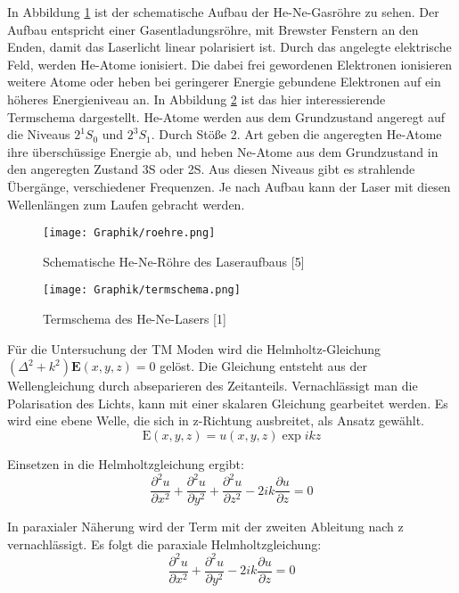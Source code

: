 \documentclass[10pt,twoside]{article}
\renewcommand{\1}{^{-1}}
\renewcommand{\2}{^{-2}}
\newcommand{\3}{^{-3}}
\newcommand{\4}{^{-4}}
\newcommand{\5}{^{-5}}
\newcommand{\6}{^{-6}}
\newcommand{\7}{^{-7}}
\newcommand{\8}{^{-8}}
\newcommand{\9}{^{-9}}
\begin{document}
In Abbildung \ref{fig:roehre} ist der schematische Aufbau der He-Ne-Gasröhre zu sehen. 
Der Aufbau entspricht einer Gasentladungsröhre, mit Brewster Fenstern an den Enden, damit das Laserlicht linear polarisiert ist.
Durch das angelegte elektrische Feld, werden He-Atome ionisiert. Die dabei frei gewordenen Elektronen ionisieren weitere Atome oder heben bei geringerer Energie gebundene Elektronen auf ein höheres Energieniveau an.
In Abbildung \ref{fig:termschema} ist das hier interessierende Termschema dargestellt.
He-Atome werden aus dem Grundzustand angeregt auf die Niveaus $2^1S_0$ und $2^3S_1$.
Durch Stöße 2. Art geben die angeregten He-Atome ihre überschüssige Energie ab, und heben Ne-Atome aus dem Grundzustand in den angeregten Zustand 3S oder 2S. Aus diesen Niveaus gibt es strahlende Übergänge, verschiedener Frequenzen. Je nach Aufbau kann der Laser mit diesen Wellenlängen zum Laufen gebracht werden.

\begin{figure}[H]
\centering
\texttt{[image: Graphik/roehre.png]}  
\caption{Schematische He-Ne-Röhre des Laseraufbaus [5]}
\label{fig:roehre}
\end{figure}

\begin{figure}[H]
\centering
\texttt{[image: Graphik/termschema.png]} 
\caption{Termschema des He-Ne-Lasers [1]}
\label{fig:termschema}
\end{figure}
Für die Untersuchung der TM Moden wird die Helmholtz-Gleichung $\left( \Delta^2 + k^2 \right) \mathbf{E}(x,y,z) = 0 $ gelöst.
Die Gleichung entsteht aus der Wellengleichung durch abseparieren des Zeitanteils.
Vernachlässigt man die Polarisation des Lichts, kann mit einer skalaren Gleichung gearbeitet werden. Es wird eine ebene Welle, die sich in z-Richtung ausbreitet, als Ansatz gewählt.
\begin{equation}
\mathrm{E}(x,y,z)=u(x,y,z)\exp{ikz}
\end{equation}

Einsetzen in die Helmholtzgleichung ergibt:
\begin{equation}
\frac{\partial^2 u}{\partial x^2} + \frac{\partial^2 u}{\partial y^2} + \frac{\partial^2 u}{\partial z^2} - 2ik \frac{\partial u}{\partial z} = 0
\end{equation}

In paraxialer Näherung wird der Term mit der zweiten Ableitung nach z vernachlässigt.
Es folgt die paraxiale Helmholtzgleichung:
\begin{equation}
\frac{\partial^2 u}{\partial x^2} + \frac{\partial^2 u}{\partial y^2} - 2ik \frac{\partial u}{\partial z} = 0
\end{equation}
\end{document}
